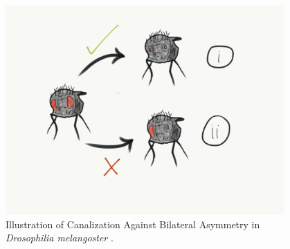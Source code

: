 \begin{figure}
\begin{columns}
\begin{column}{0.7\textwidth}
  \includegraphics[width=\textwidth]{img/fly_canalization}
 \end{column}
 \begin{column}{0.3\textwidth}
  \caption{Illustration of Canalization Against Bilateral Asymmetry in \textit{Drosophilia melangoster} \cite{Tuinstra1990LackDevelopment}.}
  \label{fig:fly_canalization}
  \end{column}
  \end{columns}
\end{figure}